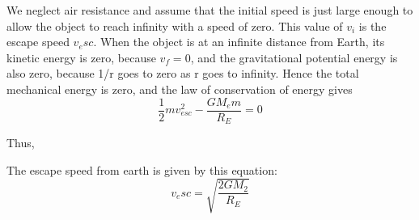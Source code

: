 We neglect air resistance and assume that the initial speed is just large enough to allow the object to reach infinity with a speed of zero. This value of $v_i$ is the escape speed $v_esc$. When the object is at an infinite distance from Earth, its kinetic energy is zero, because $v_f = 0$, and the gravitational potential energy is also zero,
because 1/r goes to zero as r goes to infinity. Hence the total mechanical energy is zero, and the law of conservation of energy gives
$$\frac{1}{2}mv_{esc}^2 - \frac{GM_em}{R_E} = 0$$

Thus,
\begin{form}
The escape speed from earth is given by this equation:
$$v_esc = \sqrt{\frac{2GM_2}{R_E}}$$
\end{form}
